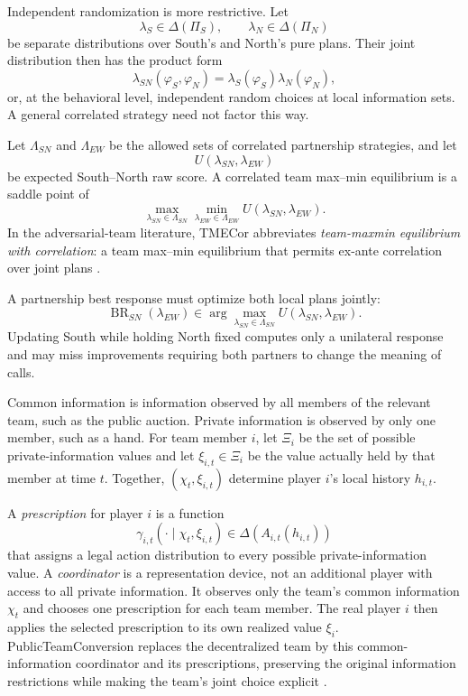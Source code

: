 Independent randomization is more restrictive. Let
\[
    \lambda_S\in\Delta(\Pi_S),
    \qquad
    \lambda_N\in\Delta(\Pi_N)
\]
be separate distributions over South's and North's pure plans. Their joint distribution then has the product form
\[
    \lambda_{SN}(\varphi_S,\varphi_N)
    =
    \lambda_S(\varphi_S)\lambda_N(\varphi_N),
\]
or, at the behavioral level, independent random choices at local information sets. A general correlated strategy need not factor this way.

Let $\Lambda_{SN}$ and $\Lambda_{EW}$ be the allowed sets of correlated partnership strategies, and let
\[
    U(\lambda_{SN},\lambda_{EW})
\]
be expected South--North raw score. A correlated team max--min equilibrium is a saddle point of
\[
    \max_{\lambda_{SN}\in\Lambda_{SN}}
    \min_{\lambda_{EW}\in\Lambda_{EW}}
    U(\lambda_{SN},\lambda_{EW}).
\]
In the adversarial-team literature, TMECor abbreviates \emph{team-maxmin equilibrium with correlation}: a team max--min equilibrium that permits ex-ante correlation over joint plans \cite{farina2018coordination,farina2021collusion}.

A partnership best response must optimize both local plans jointly:
\[
    \operatorname{BR}_{SN}(\lambda_{EW})
    \in
    \arg\max_{\lambda_{SN}\in\Lambda_{SN}}
    U(\lambda_{SN},\lambda_{EW}).
\]
Updating South while holding North fixed computes only a unilateral response and may miss improvements requiring both partners to change the meaning of calls.

Common information is information observed by all members of the relevant team, such as the public auction. Private information is observed by only one member, such as a hand. For team member $i$, let $\Xi_i$ be the set of possible private-information values and let $\xi_{i,t}\in\Xi_i$ be the value actually held by that member at time $t$. Together, $(\chi_t,\xi_{i,t})$ determine player $i$'s local history $h_{i,t}$.

A \emph{prescription} for player $i$ is a function
\[
    \gamma_{i,t}(\cdot\mid\chi_t,\xi_{i,t})
    \in
    \Delta(A_{i,t}(h_{i,t}))
\]
that assigns a legal action distribution to every possible private-information value. A \emph{coordinator} is a representation device, not an additional player with access to all private information. It observes only the team's common information $\chi_t$ and chooses one prescription for each team member. The real player $i$ then applies the selected prescription to its own realized value $\xi_i$. PublicTeamConversion replaces the decentralized team by this common-information coordinator and its prescriptions, preserving the original information restrictions while making the team's joint choice explicit \cite{carminati2022marriage}.

